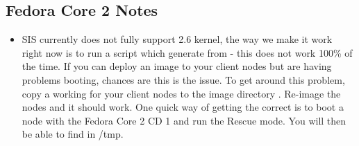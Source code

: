 \subsection{Fedora Core 2 Notes}
\label{subsec:fc2notes}

\begin{itemize}

\item SIS currently does not fully support 2.6 kernel, the way we make it
  work right now is to run a script which generate  
  from  - this does not work 100\% of the time.  If 
  you can deploy an image to your client nodes but are having problems 
  booting, chances are this is the issue.  To get around this problem, copy a
  working  for your client nodes to the image directory 
  .  Re-image the
  nodes and it should work.  One quick way of getting the correct
   is to boot a node with the Fedora Core 2 CD 1 
  and run the Rescue mode.  You will then be able to find
   in \-/tmp.

\end{itemize}

